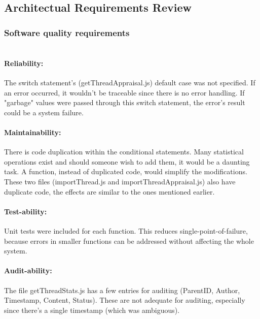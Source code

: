 \subsection{Architectual Requirements Review}

\subsubsection{Software quality requirements} 

\paragraph{\\Reliability:}
The switch statement's (getThreadAppraisal.js) default case was not specified. If an error occurred, it wouldn't be traceable since there is no error handling. If "garbage" values were passed through this switch statement, the error's result could be a system failure.
\par
\paragraph{Maintainability:}
There is code duplication within the conditional statements. Many statistical operations exist and should someone wish to add them, it would be a daunting task. A function, instead of duplicated code, would simplify the modifications. \\
These two files (importThread.js and importThreadAppraisal.js) also have duplicate code, the effects are similar to the ones mentioned earlier.
\par
\paragraph{Test-ability:}
Unit tests were included for each function. This reduces single-point-of-failure, because errors in smaller functions can be addressed without affecting the whole system.
\par
\paragraph {Audit-ability:}
The file getThreadStats.js has a few entries for auditing (ParentID, Author, Timestamp, Content, Status). These are not adequate for auditing, especially since there's a single timestamp (which was ambiguous). \\
\par


